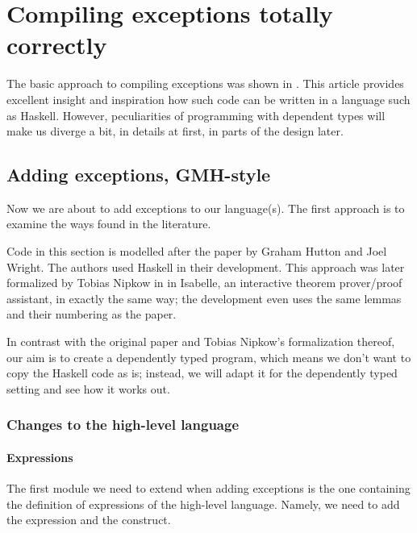 \chapter{Compiling exceptions totally correctly}


The basic approach to compiling exceptions was shown in \cite{gmh:exceptions}.
This article provides excellent insight and inspiration how such code can be written
in a language such as Haskell.
However, peculiarities of programming with dependent types will make us
diverge a bit, in details at first, in parts of the design later.

\section{Adding exceptions, GMH-style}

Now we are about to add exceptions to our language(s). The first approach is to
examine the ways found in the literature.

Code in this section is modelled after the paper \cite{gmh:exceptions} by
Graham Hutton and Joel Wright. The authors used Haskell in their development.
This approach was later formalized by Tobias Nipkow in \cite{nipkow} in
Isabelle, an interactive theorem prover/proof assistant, in exactly the same
way; the development even uses the same lemmas and their numbering as the
paper.

In contrast with the original paper and Tobias Nipkow's formalization thereof,
our aim is to create a dependently typed program, which means we don't want to
copy the Haskell code as is; instead, we will adapt it for the dependently
typed setting and see how it works out.

\subsection{Changes to the high-level language}

\subsubsection{Expressions}

The first module we need to extend when adding exceptions is the one containing
the definition of expressions of the high-level language. Namely, we need to
add the  expression and the  construct.

